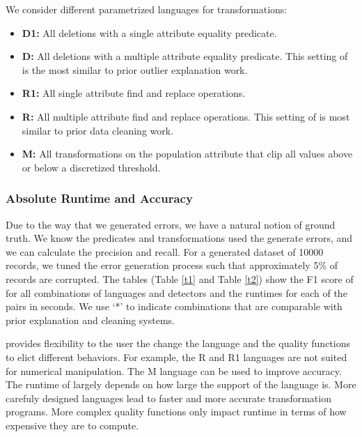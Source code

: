 We consider different parametrized languages for transformations:
\begin{itemize}[leftmargin=*, topsep=0mm, itemsep=0mm]

    \item \textbf{D1: } All deletions with a single attribute equality predicate.

    \item \textbf{D: } All deletions with a multiple attribute equality predicate. This setting of \sys is the most similar to prior outlier explanation work.

    \item \textbf{R1: } All single attribute find and replace operations.

    \item \textbf{R: } All multiple attribute find and replace operations. This setting of \sys is most similar to prior data cleaning work.

    \item \textbf{M: } All transformations on the population attribute that clip all values above or below a discretized threshold.
\end{itemize}

\subsubsection{Absolute Runtime and Accuracy}
Due to the way that we generated errors, we have a natural notion of ground truth. We know the predicates and transformations used the generate errors, and we can calculate the precision and recall. For a generated dataset of 10000 records, we tuned the error generation process such that approximately 5\% of records are corrupted. The tables (Table \ref{t1} and Table \ref{t2}) show the F1 score of \sys for all combinations of languages and detectors and the runtimes for each of the pairs in seconds. 
We use `*' to indicate combinations that are comparable with prior explanation and cleaning systems. 

\sys provides flexibility to the user the change the language and the quality functions to elict different behaviors. For example, the R and R1 languages are not suited for numerical manipulation. The M language can be used to improve accuracy. The runtime of \sys largely depends on how large the support of the language is. More carefuly designed languages lead to faster and more accurate transformation programs. More complex quality functions only impact runtime in terms of how expensive they are to compute.

